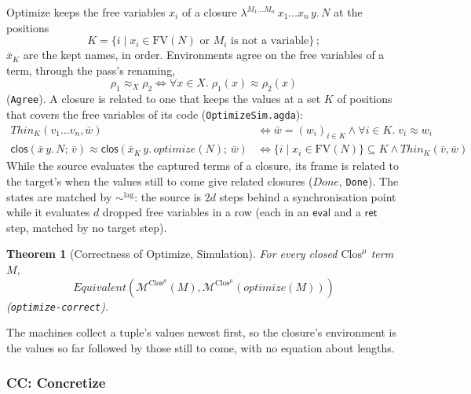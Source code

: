 \documentclass[10pt]{article}
\theoremstyle{acmplain}
\newtheorem{theorem}{Theorem}[section]
\newcommand{\key}[1]{\mathsf{#1}}
\newcommand{\pass}[1]{\mathit{#1}}
\newcommand{\clos}[2]{\lambda^{#1}\, #2.\,}
\newcommand{\FV}{\mathrm{FV}}
\newcommand{\Mach}[1]{\mathcal{M}^{#1}}
\newcommand{\Equiv}{\mathit{Equivalent}}
\newcommand{\closV}[2]{\key{clos}(#1;\, #2)}
\newcommand{\Ml}[1]{\textrm{#1}^{\mu}}                  %
\begin{document}
Optimize keeps the free variables $x_i$ of a closure
$\clos{M_1 \ldots M_n}{x_1 \ldots x_n\, y} N$ at the positions
\[ K = \{ i \mid x_i \in \FV(N) \text{ or } M_i \text{ is not a variable} \}\,; \]
$\bar{x}_K$ are the kept names, in order. Environments agree on the free
variables of a term, through the pass's renaming,
\[ \rho_1 \approx_X \rho_2 \iff \forall x \in X.\; \rho_1(x) \approx \rho_2(x) \]
(\texttt{Agree}). A closure is related to one that keeps the values at a
set $K$ of positions that covers the free variables of its code
(\texttt{OptimizeSim.agda}):
\begin{align*}
  \mathit{Thin}_K(v_1 \ldots v_n, \bar{w}) &\iff \bar{w} = (w_i)_{i \in K} \land \forall i \in K.\; v_i \approx w_i \\
  \closV{\bar{x}\, y.\, N}{\bar{v}} \approx \closV{\bar{x}_K\, y.\, \pass{optimize}(N)}{\bar{w}}
    &\iff \{ i \mid x_i \in \FV(N) \} \subseteq K \land \mathit{Thin}_K(\bar{v}, \bar{w})
\end{align*}
While the source evaluates the captured terms of a closure, its frame is
related to the target's when the values still to come give related
closures ($\mathit{Done}$, \texttt{Done}). The states are matched by
$\sim^{\mathrm{lag}}$: the source is $2d$ steps behind a synchronisation
point while it evaluates $d$ dropped free variables in a row (each in an
$\key{eval}$ and a $\key{ret}$ step, matched by no target step).
\begin{theorem}[Correctness of Optimize, Simulation]\label{thm:m-cek-optimize}
For every closed $\Ml{Clos}$ term $M$,
\[ \Equiv(\Mach{\Ml{Clos}}(M), \Mach{\Ml{Clos}}(\pass{optimize}(M))) \]
(\texttt{optimize-correct}).
\end{theorem}
The machines collect a tuple's values newest first, so the closure's
environment is the values so far followed by those still to come, with
no equation about lengths.

\subsubsection{CC: Concretize}
\end{document}
